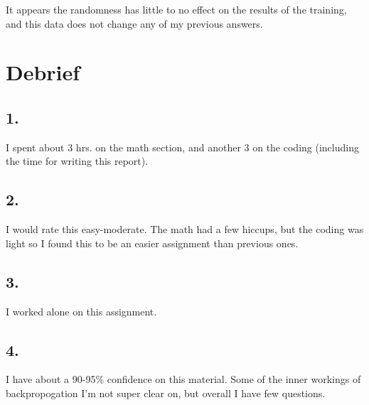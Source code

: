 \documentclass{article}
\begin{document}
        It appears the randomness has little to no effect on the results of the training, and this data does not change any of my previous answers.

    \section*{Debrief}
        \subsection*{1.}
        I spent about 3 hrs. on the math section, and another 3 on the coding (including the time for writing this report).

        \subsection*{2.}
        I would rate this easy-moderate. The math had a few hiccups, but the coding was light so I found this to be an easier assignment than previous ones.

        \subsection*{3.}
        I worked alone on this assignment.

        \subsection*{4.}
        I have about a 90-95\% confidence on this material. Some of the inner workings of backpropogation I'm not super clear on, but overall I have few questions.


    \clearpage
\end{document}
